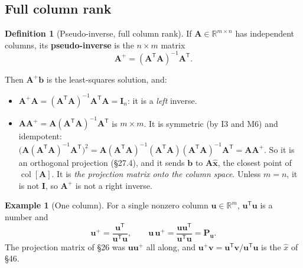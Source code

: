 \documentclass[11pt]{article}
\theoremstyle{plain}
\theoremstyle{definition}
\newtheorem{defn}{Definition}[section]
\newtheorem{ex}{Example}[section]
\theoremstyle{remark}
\newcommand{\R}{\mathbb{R}}
\newcommand{\vc}[1]{\mathbf{#1}}
\newcommand{\mt}[1]{\mathbf{#1}}
\newcommand{\T}{^{\mathsf{T}}}
\newcommand{\colsp}[1]{\operatorname{col}[#1]}
\newcommand{\xh}{\hat{\vc{x}}}
\begin{document}
\subsection{Full column rank}
\begin{defn}[Pseudo-inverse, full column rank]
If $\mt{A}\in\R^{m\times n}$ has independent columns, its \textbf{pseudo-inverse}
is the $n\times m$ matrix
\[
  \mt{A}^{+}=(\mt{A}\T\mt{A})^{-1}\mt{A}\T .
\]
\end{defn}

\noindent Then $\mt{A}^{+}\vc{b}$ is the least-squares solution, and:
\begin{itemize}[leftmargin=1.4em,itemsep=3pt]
  \item $\mt{A}^{+}\mt{A}=(\mt{A}\T\mt{A})^{-1}\mt{A}\T\mt{A}=\mt{I}_n$: it is a
        \emph{left} inverse.
  \item $\mt{A}\mt{A}^{+}=\mt{A}(\mt{A}\T\mt{A})^{-1}\mt{A}\T$ is $m\times m$. It is
        symmetric (by I3 and M6) and idempotent:
        $\bigl(\mt{A}(\mt{A}\T\mt{A})^{-1}\mt{A}\T\bigr)^{2}
        =\mt{A}(\mt{A}\T\mt{A})^{-1}(\mt{A}\T\mt{A})(\mt{A}\T\mt{A})^{-1}\mt{A}\T
        =\mt{A}\mt{A}^{+}$. So it is an orthogonal projection (\S27.4), and it
        sends $\vc{b}$ to $\mt{A}\xh$, the closest point of $\colsp{\mt{A}}$. It
        is \emph{the projection matrix onto the column space}. Unless $m=n$, it
        is not $\mt{I}$, so $\mt{A}^{+}$ is not a right inverse.
\end{itemize}

\begin{ex}[One column]
For a single nonzero column $\vc{u}\in\R^{m}$, $\vc{u}\T\vc{u}$ is a number and
\[
  \vc{u}^{+}=\frac{\vc{u}\T}{\vc{u}\T\vc{u}},
  \qquad
  \vc{u}\,\vc{u}^{+}=\frac{\vc{u}\vc{u}\T}{\vc{u}\T\vc{u}}=\mt{P}_{\vc{u}} .
\]
The projection matrix of \S26 was $\vc{u}\vc{u}^{+}$ all along, and
$\vc{u}^{+}\vc{v}=\vc{u}\T\vc{v}/\vc{u}\T\vc{u}$ is the $\hat x$ of \S46.
\end{ex}
\end{document}
